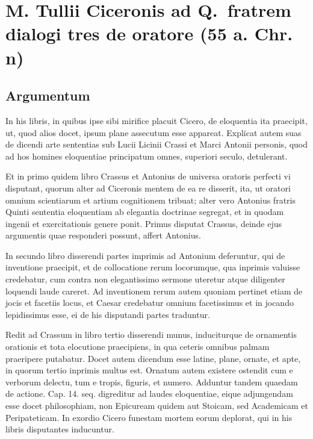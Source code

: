 
\section*{M. Tullii Ciceronis ad Q.\ fratrem \\dialogi tres de oratore (55 a. Chr. n)}

\subsection*{Argumentum}

In his libris, in quibus ipse sibi mirifice placuit Cicero, de eloquentia ita praecipit, ut, quod alios docet, ipsum plane assecutum esse appareat. Explicat autem suas de dicendi arte sententias sub Lucii Licinii Crassi et Marci Antonii personis, quod ad hos homines eloquentiae principatum omnes, superiori seculo, detulerant. 

Et in primo quidem libro Crassus et Antonius de universa oratoris perfecti vi disputant, quorum alter ad Ciceronis mentem de ea re disserit, ita, ut oratori omnium scientiarum et artium cognitionem tribuat; alter vero Antonius fratris Quinti sententia eloquentiam ab elegantia doctrinae segregat, et in quodam ingenii et exercitationis genere ponit. Primus disputat Crassus, deinde ejus argumentis quae responderi possunt, affert Antonius. 

In secundo libro disserendi partes imprimis ad Antonium deferuntur, qui de inventione praecipit, et de collocatione rerum locorumque, qua inprimis valuisse credebatur, cum contra non elegantissimo sermone uteretur atque diligenter loquendi laude careret. Ad inventionem rerum autem quoniam pertinet etiam de jocis et facetiis locus, et Caesar credebatur omnium facetissimus et in jocando lepidissimus esse, ei de his disputandi partes traduntur.

Redit ad Crassum in libro tertio disserendi munus, induciturque de ornamentis orationis et tota elocutione praecipiens, in qua ceteris omnibus palmam praeripere putabatur. Docet autem dicendum esse latine, plane, ornate, et apte, in quorum tertio inprimis multus est. Ornatum autem existere ostendit cum e verborum delectu, tum e tropis, figuris, et numero. Adduntur tandem quaedam de actione. Cap. 14. seq. digreditur ad laudes eloquentiae, eique adjungendam esse docet philosophiam, non Epicuream quidem aut Stoicam, sed Academicam et Peripateticam. In exordio Cicero funestam mortem eorum deplorat, qui in his libris disputantes inducuntur.

